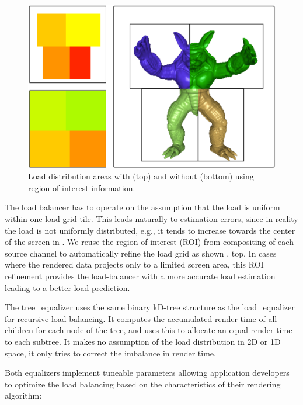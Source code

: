 \begin{figure}
  \includegraphics[width=.382\textwidth]{images/roi}
  \caption{Load distribution areas with (top) and without (bottom) using region of interest information.}
  \label{fROI}
\end{figure}

The load balancer has to operate on the assumption that the load is uniform
within one load grid tile. This leads naturally to estimation errors, since in
reality the load is not uniformly distributed, e.g., it tends to increase
towards the center of the screen in . We reuse the region of interest
(ROI) from compositing of each source channel to automatically refine the load
grid as shown , top. In cases where the rendered data projects only
to a limited screen area, this ROI refinement provides the load-balancer with a
more accurate load estimation leading to a better load prediction.

The \textsf{tree\_equalizer} uses the same binary kD-tree structure as the
\textsf{load\_equalizer} for recursive load balancing. It computes the
accumulated render time of all children for each node of the tree, and uses
this to allocate an equal render time to each subtree. It makes no assumption
of the load distribution in 2D or 1D space, it only tries to correct the
imbalance in render time.

Both equalizers implement tuneable parameters allowing application developers to
optimize the load balancing based on the characteristics of their rendering
algorithm:

